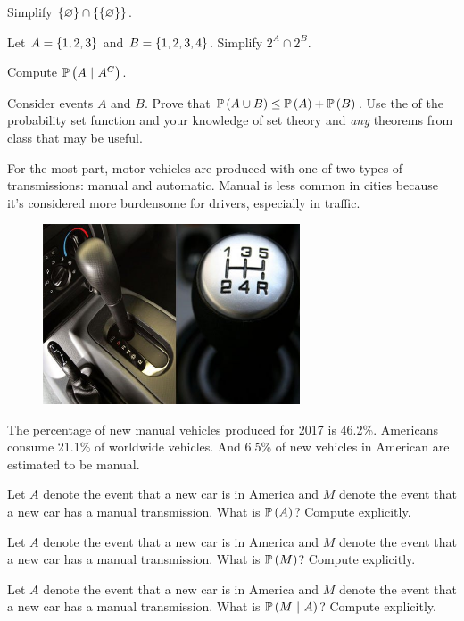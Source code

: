 \documentclass[12pt]{article}
\begin{document}
Simplify $\left\{\varnothing\right\} \cap \left\{\left\{\varnothing\right\}\right\}$. 

 Let $A = \left\{1,2,3\right\}$ and $B = \left\{1,2,3,4\right\}$. Simplify $2^A \cap 2^B$. 

 Compute $\mathbb{P}\left(A~|~A^C\right)$. 

 Consider events $A$ and $B$. Prove that $\mathbb{P}\left(A \cup B\right) \leq \mathbb{P}\left(A\right) + \mathbb{P}\left(B\right)$. Use the  of the probability set function and your knowledge of set theory and \textit{any} theorems from class that may be useful. 



\eenum

\problem For the most part, motor vehicles are produced with one of two types of transmissions: manual and automatic. Manual is less common in cities because it's considered more burdensome for drivers, especially in traffic.

\begin{figure}[htp]
\centering
\includegraphics[width=3in]{manualvsautomatic.jpg}
\end{figure}

The percentage of new manual vehicles produced for 2017 is 46.2\%. Americans consume 21.1\% of worldwide vehicles. And 6.5\% of new vehicles in American are estimated to be manual.

\benum
{} Let $A$ denote the event that a new car is in America and $M$ denote the event that a new car has a manual transmission. What is $\mathbb{P}\left(A\right)$? Compute explicitly. 

 Let $A$ denote the event that a new car is in America and $M$ denote the event that a new car has a manual transmission. What is $\mathbb{P}\left(M\right)$? Compute explicitly. 


 Let $A$ denote the event that a new car is in America and $M$ denote the event that a new car has a manual transmission. What is $\mathbb{P}\left(M~|~A\right)$? Compute explicitly. 
\end{document}
